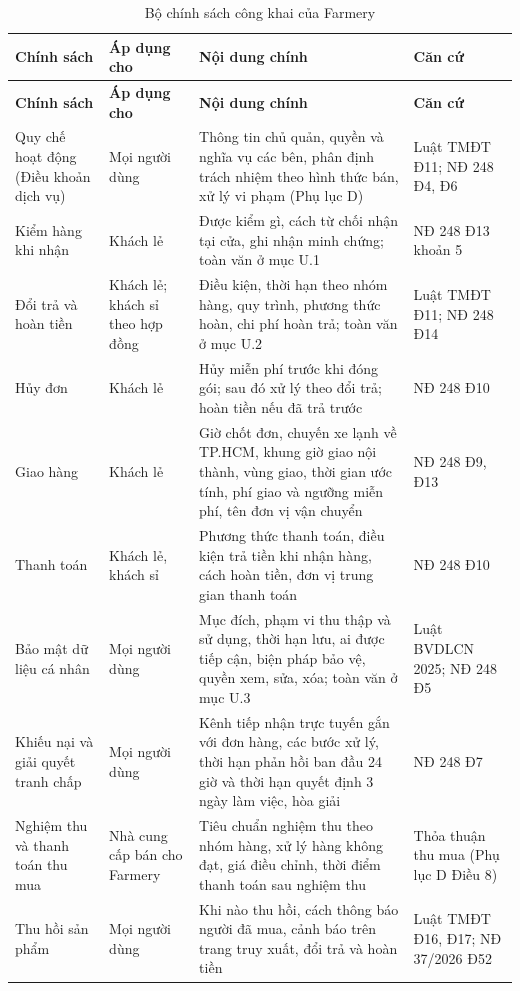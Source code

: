 \begingroup
\tblsetup\tblzebra
\begin{longtable}{L{3.30cm} L{2.70cm} L{6.20cm} L{2.70cm}}
\caption{Bộ chính sách công khai của Farmery}
\label{tab:bochinhsach} \\
\toprule
{}
\textbf{Chính sách} & \textbf{Áp dụng cho} & \textbf{Nội dung chính} & \textbf{Căn cứ} \\
\midrule
\endfirsthead
\toprule
{}
\textbf{Chính sách} & \textbf{Áp dụng cho} & \textbf{Nội dung chính} & \textbf{Căn cứ} \\
\midrule
\endhead
\bottomrule
\endfoot
Quy chế hoạt động (Điều khoản dịch vụ) & Mọi người dùng & Thông tin chủ quản, quyền và nghĩa vụ các bên, phân định trách nhiệm theo hình thức bán, xử lý vi phạm (Phụ lục D) & Luật TMĐT Đ11; NĐ 248 Đ4, Đ6 \\
Kiểm hàng khi nhận & Khách lẻ & Được kiểm gì, cách từ chối nhận tại cửa, ghi nhận minh chứng; toàn văn ở mục U.1 & NĐ 248 Đ13 khoản 5 \\
Đổi trả và hoàn tiền & Khách lẻ; khách sỉ theo hợp đồng & Điều kiện, thời hạn theo nhóm hàng, quy trình, phương thức hoàn, chi phí hoàn trả; toàn văn ở mục U.2 & Luật TMĐT Đ11; NĐ 248 Đ14 \\
Hủy đơn & Khách lẻ & Hủy miễn phí trước khi đóng gói; sau đó xử lý theo đổi trả; hoàn tiền nếu đã trả trước & NĐ 248 Đ10 \\
Giao hàng & Khách lẻ & Giờ chốt đơn, chuyến xe lạnh về TP.HCM, khung giờ giao nội thành, vùng giao, thời gian ước tính, phí giao và ngưỡng miễn phí, tên đơn vị vận chuyển & NĐ 248 Đ9, Đ13 \\
Thanh toán & Khách lẻ, khách sỉ & Phương thức thanh toán, điều kiện trả tiền khi nhận hàng, cách hoàn tiền, đơn vị trung gian thanh toán & NĐ 248 Đ10 \\
Bảo mật dữ liệu cá nhân & Mọi người dùng & Mục đích, phạm vi thu thập và sử dụng, thời hạn lưu, ai được tiếp cận, biện pháp bảo vệ, quyền xem, sửa, xóa; toàn văn ở mục U.3 & Luật BVDLCN 2025; NĐ 248 Đ5 \\
Khiếu nại và giải quyết tranh chấp & Mọi người dùng & Kênh tiếp nhận trực tuyến gắn với đơn hàng, các bước xử lý, thời hạn phản hồi ban đầu 24 giờ và thời hạn quyết định 3 ngày làm việc, hòa giải & NĐ 248 Đ7 \\
Nghiệm thu và thanh toán thu mua & Nhà cung cấp bán cho Farmery & Tiêu chuẩn nghiệm thu theo nhóm hàng, xử lý hàng không đạt, giá điều chỉnh, thời điểm thanh toán sau nghiệm thu & Thỏa thuận thu mua (Phụ lục D Điều 8) \\
Thu hồi sản phẩm & Mọi người dùng & Khi nào thu hồi, cách thông báo người đã mua, cảnh báo trên trang truy xuất, đổi trả và hoàn tiền & Luật TMĐT Đ16, Đ17; NĐ 37/2026 Đ52 \\
\end{longtable}
\endgroup

